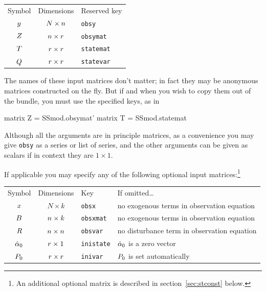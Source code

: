 \begin{center}
\begin{tabular}{ccl}
Symbol & Dimensions & Reserved key \\[6pt]
$y$    & $N \times n$ & \texttt{obsy}\\
$Z$   & $n \times r$ & \texttt{obsymat}\\
$T$  & $r \times r$ & \texttt{statemat}\\
$Q$  & $r \times r$ & \texttt{statevar}\\
\end{tabular}
\end{center}


The names of these input matrices don't matter; in fact they may be
anonymous matrices constructed on the fly. But if and when you wish to
copy them out of the bundle, you must use the specified keys, as in
\begin{code}
matrix Z = SSmod.obsymat'
matrix T = SSmod.statemat
\end{code}

Although all the arguments are in principle matrices, as a convenience
you may give \texttt{obsy} as a series or list of series, and the
other arguments can be given as scalars if in context they are
$1 \times 1$.

If applicable you may specify any of the following optional input
matrices:\footnote{An additional optional matrix is described in
section~\ref{sec:stconst} below.}

\begin{center}
\begin{tabular}{ccll}
Symbol & Dimensions & Key & If omitted\dots \\[6pt]
$x$ & $N \times k$ & \texttt{obsx} &
 no exogenous terms in observation equation\\
$B$ & $n \times k$ & \texttt{obsxmat} &
 no exogenous terms in observation equation\\
$R$ & $n \times n$ & \texttt{obsvar} &
 no disturbance term in observation equation \\
$\hat{\alpha}_0$ & $r \times 1$ & \texttt{inistate} &
 $\hat{\alpha}_0$ is a zero vector\\
$P_0$ & $r \times r$ & \texttt{inivar} &
 $P_0$ is set automatically
\end{tabular}
\end{center}


